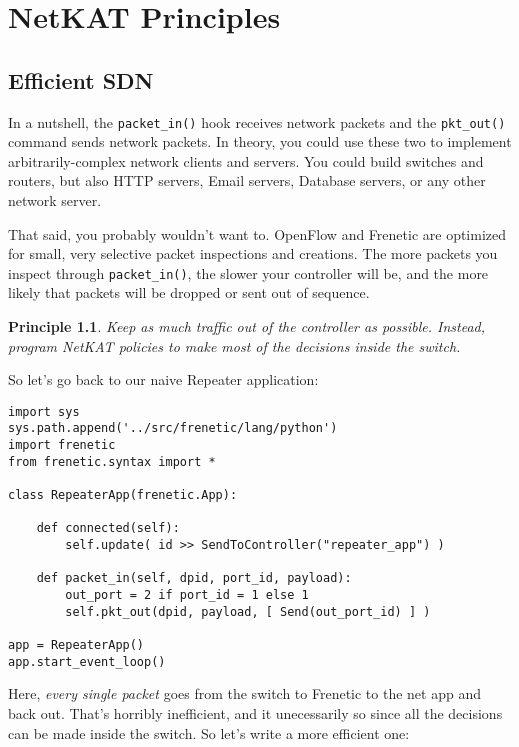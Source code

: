 
\chapter{NetKAT Principles}

\newtheorem{principle}{Principle}

\section{Efficient SDN}

In a nutshell, the \texttt{packet\_in()} hook receives network packets and the \texttt{pkt\_out()} command sends
network packets.  
In theory, you could use these two to implement arbitrarily-complex network clients and servers.  
You could build switches and routers, but also HTTP servers, Email servers, Database servers, or any other 
network server.  

That said, you probably wouldn't want to.
OpenFlow and Frenetic are optimized for small, very selective packet inspections and creations.  
The more packets you inspect through \texttt{packet\_in()}, the slower your controller will be, and
the more likely that packets will be dropped or sent out of sequence.  

\begin{principle}
\label{principle:controller}
Keep as much traffic out of the controller as possible.
Instead, program NetKAT policies to make most of the decisions inside the switch.  
\end{principle}

So let's go back to our naive Repeater application:

\begin{lstlisting}
import sys
sys.path.append('../src/frenetic/lang/python')
import frenetic
from frenetic.syntax import *

class RepeaterApp(frenetic.App):

    def connected(self):
        self.update( id >> SendToController("repeater_app") )

    def packet_in(self, dpid, port_id, payload):
        out_port = 2 if port_id = 1 else 1
        self.pkt_out(dpid, payload, [ Send(out_port_id) ] )

app = RepeaterApp()
app.start_event_loop()
\end{lstlisting}

Here, \emph{every single packet} goes from the switch to Frenetic to the net app and back out. 
That's horribly inefficient, and it unecessarily so since all the decisions can be made inside the switch.
So let's write a more efficient one:


